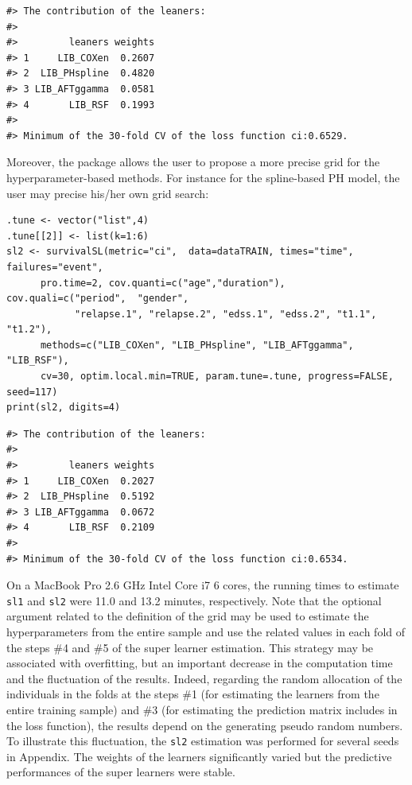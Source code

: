 \begin{verbatim}
#> The contribution of the leaners: 
#> 
#>         leaners weights
#> 1     LIB_COXen  0.2607
#> 2  LIB_PHspline  0.4820
#> 3 LIB_AFTggamma  0.0581
#> 4       LIB_RSF  0.1993
#> 
#> Minimum of the 30-fold CV of the loss function ci:0.6529.
\end{verbatim}

Moreover, the package allows the user to propose a more precise grid for the hyperparameter-based methods. For instance for the spline-based PH model, the user may precise his/her own grid search:

\begin{verbatim}
.tune <- vector("list",4)
.tune[[2]] <- list(k=1:6)
sl2 <- survivalSL(metric="ci",  data=dataTRAIN, times="time", failures="event",
      pro.time=2, cov.quanti=c("age","duration"), cov.quali=c("period",  "gender",
            "relapse.1", "relapse.2", "edss.1", "edss.2", "t1.1", "t1.2"),
      methods=c("LIB_COXen", "LIB_PHspline", "LIB_AFTggamma", "LIB_RSF"),
      cv=30, optim.local.min=TRUE, param.tune=.tune, progress=FALSE, seed=117)
print(sl2, digits=4)
\end{verbatim}

\begin{verbatim}
#> The contribution of the leaners: 
#> 
#>         leaners weights
#> 1     LIB_COXen  0.2027
#> 2  LIB_PHspline  0.5192
#> 3 LIB_AFTggamma  0.0672
#> 4       LIB_RSF  0.2109
#> 
#> Minimum of the 30-fold CV of the loss function ci:0.6534.
\end{verbatim}

On a MacBook Pro 2.6 GHz Intel Core i7 6 cores, the running times to estimate \texttt{sl1} and \texttt{sl2} were 11.0 and 13.2 minutes, respectively. Note that the optional argument related to the definition of the grid may be used to estimate the hyperparameters from the entire sample and use the related values in each fold of the steps \#4 and \#5 of the super learner estimation. This strategy may be associated with overfitting, but an important decrease in the computation time and the fluctuation of the results. Indeed, regarding the random allocation of the individuals in the folds at the steps \#1 (for estimating the learners from the entire training sample) and \#3 (for estimating the prediction matrix includes in the loss function), the results depend on the generating pseudo random numbers. To illustrate this fluctuation, the \texttt{sl2} estimation was performed for several seeds in Appendix. The weights of the learners significantly varied but the predictive performances of the super learners were stable.

